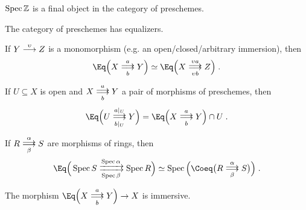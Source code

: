 \documentclass[a4paper,parskip=half,numbers=enddot, DIV=12]{scrreprt}
\begin{document}
\begin{cor}
	$\operatorname{Spec}\mathbb{Z}$ is a final object in the category of preschemes.
\end{cor}
\begin{cor}
	\begin{alphanumerate}
		\item {}The category of preschemes has equalizers.
		\item If $Y\morphism[\upsilon]Z$ is a monomorphism (e.g. an open/closed/arbitrary immersion), then
		\begin{align*}
			\Eq\Big(X\doublemorphism[a][b]Y\Big)\simeq\Eq\Big(X\doublemorphism[\upsilon a][\upsilon b]Z\Big)\;.
		\end{align*}
		\item If $U\subseteq X$ is open and $X\doublemorphism[\smash{a}][b]Y$ a pair of morphisms of preschemes, then
		\begin{align*}
			\Eq\Big(U\doublemorphism[a|_U][b|_U]Y\Big)=\Eq\Big(X\doublemorphism[a][b]Y\Big)\cap U\;.
		\end{align*}
		\item If $R\doublemorphism[\smash{\alpha}][\smash{\beta}]S$ are morphisms of rings, then
		\begin{align*}
			\Eq\Big(\Spec S\xdoublemorphism[\Spec \alpha][\Spec \beta]\Spec R\Big)\simeq \Spec\Big(\Coeq\big(R\doublemorphism[\smash{\alpha}][\smash{\beta}]S\big)\Big)\;.
		\end{align*}
		\item The morphism $\Eq\Big(X\doublemorphism[a][b]Y\Big)\morphism X$ is immersive.
	\end{alphanumerate}
\end{cor}
\end{document}
